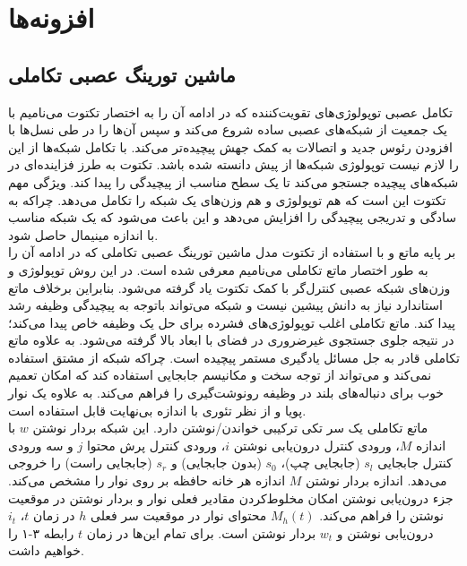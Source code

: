 \chapter{افزونه‌ها}

\section{ماشین تورینگ عصبی تکاملی}
تکامل عصبی توپولوژی‌های تقویت‌کننده که در ادامه آن را به اختصار تکتوت می‌نامیم با یک جمعیت از شبکه‌های عصبی ساده شروع می‌کند و سپس آن‌ها را در طی نسل‌ها با افزودن رئوس جدید و اتصالات به کمک جهش پیچیده‌تر می‌کند. با تکامل شبکه‌ها از این را لازم نیست توپولوژی شبکه‌ها از پیش دانسته شده باشد. تکتوت به طرز فزاینده‌ای در شبکه‌های پیچیده جستجو می‌کند تا یک سطح مناسب از پیچیدگی را پیدا کند. ویژگی مهم تکتوت این است که هم توپولوژی و هم وزن‌های یک شبکه را تکامل می‌دهد. چراکه به سادگی و تدریجی پیچیدگی را افزایش می‌دهد و این باعث می‌شود که یک شبکه مناسب با اندازه مینیمال حاصل شود.\cite{merrild2018hyperntm}
\\

بر پایه ماتع و با استفاده از تکتوت مدل ماشین تورینگ عصبی تکاملی که در ادامه آن را به طور اختصار ماتع تکاملی می‌نامیم معرفی شده است. در این روش توپولوژی و وزن‌های شبکه عصبی کنترل‌گر با کمک تکتوت یاد گرفته می‌شود. بنابراین برخلاف ماتع استاندارد نیاز به دانش پیشین نیست و شبکه می‌تواند باتوجه به پیچیدگی وظیفه رشد پیدا کند. ماتع تکاملی اغلب توپولوژی‌‌های فشرده برای حل یک وظیفه خاص پیدا می‌کند؛ در نتیجه جلوی جستجوی غیرضروری در فضای با ابعاد بالا گرفته می‌شود. به علاوه ماتع تکاملی قادر به جل مسائل یادگیری مستمر پیچیده است. چراکه شبکه از مشتق استفاده نمی‌کند و می‌تواند از توجه سخت و مکانیسم جابجایی استفاده کند که امکان تعمیم خوب برای دنباله‌های بلند در وظیفه رونوشت‌گیری را فراهم می‌کند. به علاوه یک نوار پویا و از نظر تئوری با اندازه بی‌نهایت قابل استفاده است.\cite{merrild2018hyperntm}
\\

ماتع تکاملی یک سر تکی ترکیبی خواندن/نوشتن دارد. این شبکه بردار نوشتن $w$ با اندازه $M$، ورودی کنترل درون‌یابی نوشتن $i$، ورودی کنترل پرش محتوا $j$ و سه ورودی کنترل جابجایی $s_l$ (جابجایی چپ)، $s_0$ (بدون جابجایی) و $s_r$ (جابجایی راست) را خروجی می‌دهد. اندازه بردار نوشتن $M$ اندازه هر خانه حافظه بر روی نوار را مشخص می‌کند. جزء درون‌یابی نوشتن امکان مخلوط‌کردن مقادیر فعلی نوار و بردار نوشتن در موقعیت نوشتن را فراهم می‌کند. $M_h(t)$ محتوای نوار در موقعیت سر فعلی $h$ در زمان $t$، $i_t$ درون‌یابی نوشتن و $w_t$ بردار نوشتن است. برای تمام این‌ها در زمان $t$ رابطه ۳-۱ را خواهیم داشت.\cite{merrild2018hyperntm}

